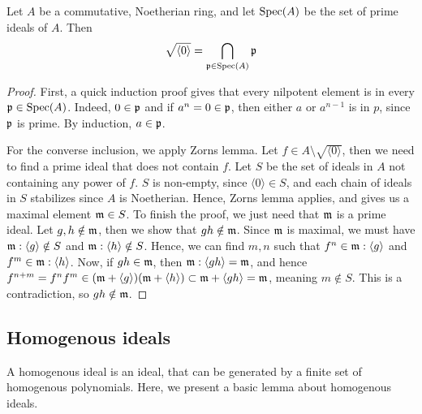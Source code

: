 \begin{theorem}\label{thm:nil_rad_is_cap_primes}
  Let $A$ be a commutative, Noetherian ring, and let $\operatorname{Spec}(A)$ be the set of prime ideals of $A$. Then
  \[\sqrt{\langle 0 \rangle} = \bigcap_{\mathfrak p \in \operatorname{Spec}(A)} \mathfrak p\]
\end{theorem}
\begin{proof}
  First, a quick induction proof gives that every nilpotent element is in every $\mathfrak p \in \operatorname{Spec}(A)$. Indeed, $0 \in \mathfrak p$ and if $a^{n} = 0 \in \mathfrak p$, then either $a$ or $a^{n-1}$ is in $p$, since $\mathfrak p$ is prime. By induction, $a \in \mathfrak p$.

  For the converse inclusion, we apply Zorns lemma. Let $f \in A \setminus \sqrt{\langle 0 \rangle}$, then we need to find a prime ideal that does not contain $f$. Let $S$ be the set of ideals in $A$ not containing any power of $f$. $S$ is non-empty, since $\langle 0 \rangle \in S$, and each chain of ideals in $S$ stabilizes since $A$ is Noetherian. Hence, Zorns lemma applies, and gives us a maximal element $\mathfrak{m} \in S$. To finish the proof, we just need that $\mathfrak{m}$ is a prime ideal. Let $g, h \notin \mathfrak{m}$, then we show that $g h \notin \mathfrak{m}$. Since $\mathfrak{m}$ is maximal, we must have $\mathfrak{m} : \langle g \rangle \notin S$ and $\mathfrak{m} : \langle h \rangle \notin S$. Hence, we can find $m, n$ such that $f^{n} \in \mathfrak{m} : \langle g \rangle$ and $f^{m} \in \mathfrak{m} : \langle h \rangle$. Now, if $g h \in \mathfrak{m}$, then $\mathfrak{m} : \langle g h \rangle = \mathfrak{m}$, and hence $f^{n + m} = f^{n} f^{m} \in (\mathfrak{m} + \langle g \rangle)(\mathfrak{m} + \langle h \rangle) \subset \mathfrak{m} + \langle g h \rangle = \mathfrak{m}$, meaning $m \notin S$. This is a contradiction, so $g h \notin \mathfrak{m}$.
\end{proof}




\subsection{Homogenous ideals}

A homogenous ideal is an ideal, that can be generated by a finite set of homogenous polynomials. Here, we present a basic lemma about homogenous ideals.

